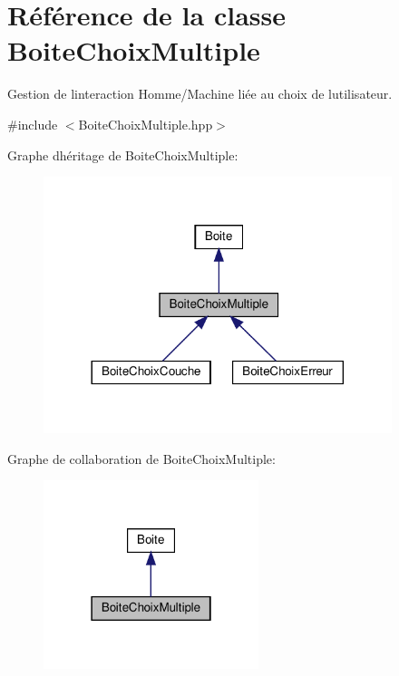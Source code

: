 \hypertarget{class_boite_choix_multiple}{}\section{Référence de la classe Boite\+Choix\+Multiple}
\label{class_boite_choix_multiple}


Gestion de l\textquotesingle{}interaction Homme/\+Machine liée au choix de l\textquotesingle{}utilisateur.  




{\ttfamily \#include $<$Boite\+Choix\+Multiple.\+hpp$>$}



Graphe d\textquotesingle{}héritage de Boite\+Choix\+Multiple\+:\nopagebreak
\begin{figure}[H]
\begin{center}
\leavevmode
\includegraphics[width=288pt]{class_boite_choix_multiple__inherit__graph}
\end{center}
\end{figure}


Graphe de collaboration de Boite\+Choix\+Multiple\+:\nopagebreak
\begin{figure}[H]
\begin{center}
\leavevmode
\includegraphics[width=178pt]{class_boite_choix_multiple__coll__graph}
\end{center}
\end{figure}
